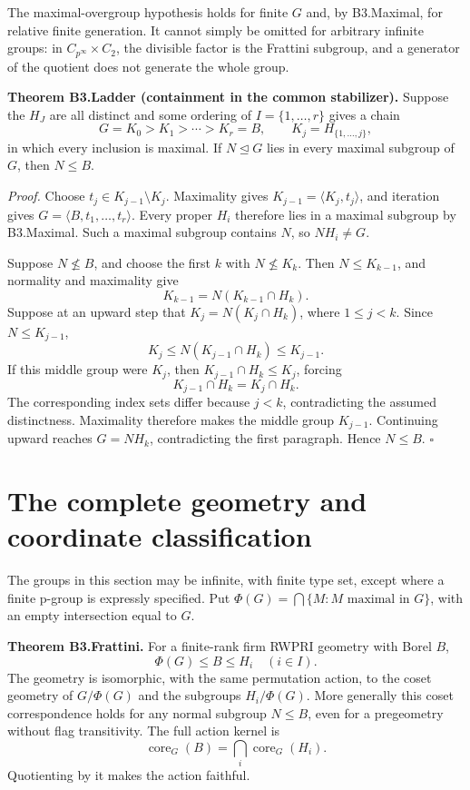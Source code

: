 The maximal-overgroup hypothesis holds for finite \(G\) and, by B3.Maximal, for relative finite generation. It cannot simply be omitted for arbitrary infinite groups: in \(C_{p^\infty}\times C_2\), the divisible factor is the Frattini subgroup, and a generator of the quotient does not generate the whole group.

\textbf{Theorem B3.Ladder (containment in the common stabilizer).} Suppose the \(H_J\) are all distinct and some ordering of \(I=\{1,\ldots,r\}\) gives a chain \begin{equation}
G=K_0>K_1>\cdots>K_r=B,\qquad K_j=H_{\{1,\ldots,j\}},
\label{eq:frattini-coordinate-geometries:6-6}
\end{equation} in which every inclusion is maximal. If \(N\unlhd G\) lies in every maximal subgroup of \(G\), then \(N\leq B\).

\emph{Proof.} Choose \(t_j\in K_{j-1}\setminus K_j\). Maximality gives \(K_{j-1}=\langle K_j,t_j\rangle\), and iteration gives \(G=\langle B,t_1,\ldots,t_r\rangle\). Every proper \(H_i\) therefore lies in a maximal subgroup by B3.Maximal. Such a maximal subgroup contains \(N\), so \(NH_i\ne G\).

Suppose \(N\not\leq B\), and choose the first \(k\) with \(N\not\leq K_k\). Then \(N\leq K_{k-1}\), and normality and maximality give \[
K_{k-1}=N(K_{k-1}\cap H_k).
\] Suppose at an upward step that \(K_j=N(K_j\cap H_k)\), where \(1\leq j<k\). Since \(N\leq K_{j-1}\), \[
K_j\leq N(K_{j-1}\cap H_k)\leq K_{j-1}.
\] If this middle group were \(K_j\), then \(K_{j-1}\cap H_k\leq K_j\), forcing \[
K_{j-1}\cap H_k=K_j\cap H_k.
\] The corresponding index sets differ because \(j<k\), contradicting the assumed distinctness. Maximality therefore makes the middle group \(K_{j-1}\). Continuing upward reaches \(G=NH_k\), contradicting the first paragraph. Hence \(N\leq B\). \(\square\)
\section{The complete geometry and coordinate classification}
The groups in this section may be infinite, with finite type set, except where a finite p-group is expressly specified. Put \(\Phi(G)=\bigcap\{M:M\text{ maximal in }G\}\), with an empty intersection equal to \(G\).

\textbf{Theorem B3.Frattini.} For a finite-rank firm RWPRI geometry with Borel \(B\), \begin{equation}
\Phi(G)\leq B\leq H_i\quad(i\in I).
\label{eq:frattini-coordinate-geometries:6-1}
\end{equation} The geometry is isomorphic, with the same permutation action, to the coset geometry of \(G/\Phi(G)\) and the subgroups \(H_i/\Phi(G)\). More generally this coset correspondence holds for any normal subgroup \(N\leq B\), even for a pregeometry without flag transitivity. The full action kernel is \begin{equation}
\operatorname{core}_G(B)=\bigcap_i\operatorname{core}_G(H_i).
\label{eq:frattini-coordinate-geometries:6-2}
\end{equation} Quotienting by it makes the action faithful.

